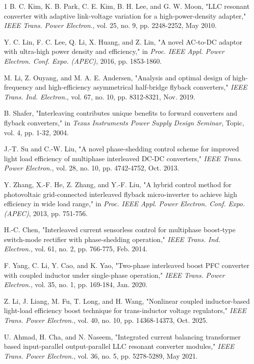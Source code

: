 \documentclass[lettersize,journal]{IEEEtran}
\begin{document}
\begin{thebibliography}{1}
B. C. Kim, K. B. Park, C. E. Kim, B. H. Lee, and G. W. Moon, "LLC resonant converter with adaptive link-voltage variation for a high-power-density adapter," \textit{IEEE Trans. Power Electron.}, vol. 25, no. 9, pp. 2248-2252, May 2010.

Y. C. Lin, F. C. Lee, Q. Li, X. Huang, and Z. Lin, "A novel AC-to-DC adaptor with ultra-high power density and efficiency," in \textit{Proc. IEEE Appl. Power Electron. Conf. Expo. (APEC)}, 2016, pp. 1853-1860.

M. Li, Z. Ouyang, and M. A. E. Andersen, "Analysis and optimal design of high-frequency and high-efficiency asymmetrical half-bridge flyback converters," \textit{IEEE Trans. Ind. Electron.}, vol. 67, no. 10, pp. 8312-8321, Nov. 2019.

B. Shafer, "Interleaving contributes unique benefits to forward converters and flyback converters," in \textit{Texas Instruments Power Supply Design Seminar}, Topic, vol. 4, pp. 1-32, 2004.

J.-T. Su and C.-W. Liu, "A novel phase-shedding control scheme for improved light load efficiency of multiphase interleaved DC-DC converters," \textit{IEEE Trans. Power Electron.}, vol. 28, no. 10, pp. 4742-4752, Oct. 2013.

Y. Zhang, X.-F. He, Z. Zhang, and Y.-F. Liu, "A hybrid control method for photovoltaic grid-connected interleaved flyback micro-inverter to achieve high efficiency in wide load range," in \textit{Proc. IEEE Appl. Power Electron. Conf. Expo. (APEC)}, 2013, pp. 751-756.

H.-C. Chen, "Interleaved current sensorless control for multiphase boost-type switch-mode rectifier with phase-shedding operation," \textit{IEEE Trans. Ind. Electron.}, vol. 61, no. 2, pp. 766-775, Feb. 2014.

F. Yang, C. Li, Y. Cao, and K. Yao, "Two-phase interleaved boost PFC converter with coupled inductor under single-phase operation," \textit{IEEE Trans. Power Electron.}, vol. 35, no. 1, pp. 169-184, Jan. 2020.

Z. Li, J. Liang, M. Fu, T. Long, and H. Wang, "Nonlinear coupled inductor-based light-load efficiency boost technique for trans-inductor voltage regulators," \textit{IEEE Trans. Power Electron.}, vol. 40, no. 10, pp. 14368-14373, Oct. 2025.

U. Ahmad, H. Cha, and N. Naseem, "Integrated current balancing transformer based input-parallel output-parallel LLC resonant converter modules," \textit{IEEE Trans. Power Electron.}, vol. 36, no. 5, pp. 5278-5289, May 2021.


\end{thebibliography}
\end{document}
